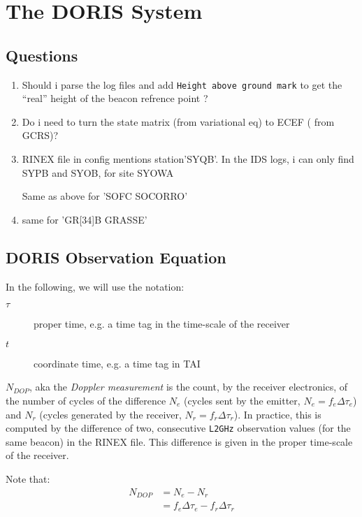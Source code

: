 \chapter{The DORIS System}
\label{ch:doris-system}

\section{Questions}
\begin{enumerate}
  \item Should i parse the log files and add \texttt{Height above ground mark}
    to get the ``real'' height of the beacon refrence point ?

  \item Do i need to turn the state matrix (from variational eq) to ECEF (
  from GCRS)?

  \item RINEX file in config mentions station'SYQB'. In the IDS logs, i can 
  only find SYPB and SYOB, for site SYOWA

  \ietm Same as above for 'SOFC SOCORRO'

  \item same for 'GR[34]B GRASSE'
\end{enumerate}

\section{DORIS Observation Equation}
\label{sec:doppler-effect}

In the following, we will use the notation:
\begin{description}
  \item[$\tau$] proper time, e.g. a time tag in the time-scale of the receiver
  \item[$t$] coordinate time, e.g. a time tag in TAI
\end{description}

$N_{DOP}$, aka the \emph{Doppler measurement} is the count, by the receiver 
electronics, of the number of cycles of the difference $N_e$ (cycles sent by the 
emitter, $N_e=f_e \Delta \tau_e$) and $N_r$ (cycles generated by the receiver, 
$N_r=f_r \Delta \tau_r$). In practice, this is computed by the difference of two, 
consecutive \texttt{L2GHz} observation values (for the same beacon) in the RINEX file.
This difference is given in the proper time-scale of the receiver.

Note that:
\begin{equation}
  \begin{split}
    N_{DOP} & = N_e - N_r\\
            & = f_e \Delta\tau_e - f_r \Delta\tau_r
  \end{split}
\end{equation}


